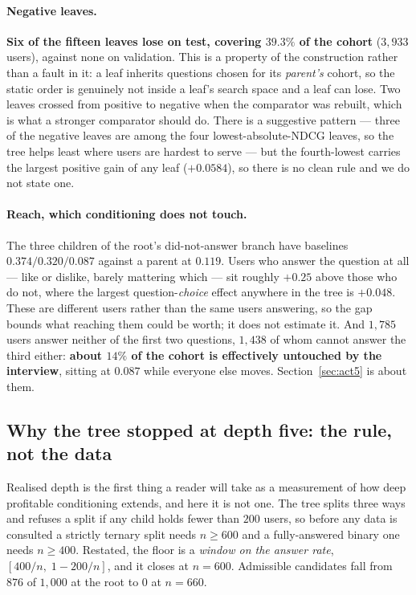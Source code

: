\documentclass[11pt]{article}
\begin{document}
\paragraph{Negative leaves.} \textbf{Six of the fifteen leaves lose on test, covering $39.3\%$ of the
cohort} ($3{,}933$ users), against none on validation. This is a property of the construction rather
than a fault in it: a leaf inherits questions chosen for its \emph{parent's} cohort, so the static
order is genuinely not inside a leaf's search space and a leaf can lose. Two leaves crossed from
positive to negative when the comparator was rebuilt, which is what a stronger comparator should do.
There is a suggestive pattern --- three of the negative leaves are among the four
lowest-absolute-NDCG leaves, so the tree helps least where users are hardest to serve --- but the
fourth-lowest carries the largest positive gain of any leaf ($+0.0584$), so there is no clean rule
and we do not state one.

\paragraph{Reach, which conditioning does not touch.} The three children of the root's
did-not-answer branch have baselines $0.374 / 0.320 / 0.087$ against a parent at $0.119$. Users who answer
the question at all --- like or dislike, barely mattering which --- sit roughly $+0.25$ above those
who do not, where the largest question-\emph{choice} effect anywhere in the tree is $+0.048$. These
are different users rather than the same users answering, so the gap bounds what reaching them could
be worth; it does not estimate it. And $1{,}785$ users
answer neither of the first two questions, $1{,}438$ of whom cannot answer the third either:
\textbf{about $14\%$ of the cohort is effectively untouched by the interview}, sitting at $0.087$
while everyone else moves. Section~\ref{sec:act5} is about them.

\subsection{Why the tree stopped at depth five: the rule, not the data}
\label{sec:depth}

Realised depth is the first thing a reader will take as a measurement of how deep profitable
conditioning extends, and here it is not one. The tree splits three ways and refuses a split if any child holds fewer than
$200$ users, so before any data is consulted a strictly ternary split needs $n\ge600$ and a
fully-answered binary one needs $n\ge400$. Restated, the floor is a \emph{window on the answer rate},
$[400/n,\;1-200/n]$, and it closes at $n=600$. Admissible candidates fall from $876$ of $1{,}000$ at
the root to $0$ at $n=660$.
\end{document}
